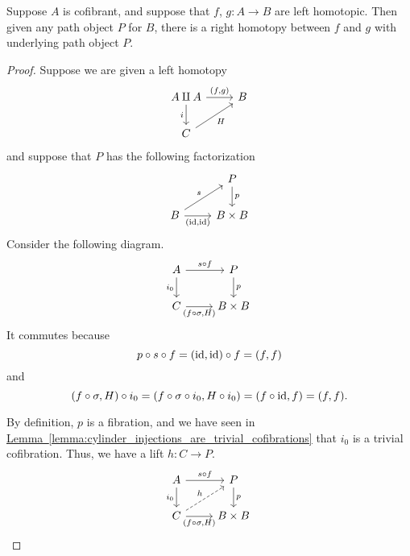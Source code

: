 \documentclass[main.tex]{subfiles}
\begin{document}
\begin{lemma}
  \label{lemma:left_homotopy_implies_right_homotopy}
  Suppose $A$ is cofibrant, and suppose that $f$, $g\colon A \to B$ are left homotopic. Then given any path object $P$ for $B$, there is a right homotopy between $f$ and $g$ with underlying path object $P$.
\end{lemma}
\begin{proof}
  Suppose we are given a left homotopy
  \begin{equation*}
    \begin{tikzcd}
      A \amalg A
      \arrow[r, "{(f, g)}"]
      \arrow[d, swap, "i"]
      & B
      \\
      C
      \arrow[ur, swap, "H"]
    \end{tikzcd}
  \end{equation*}
  and suppose that $P$ has the following factorization
  \begin{equation*}
    \begin{tikzcd}
      & P
      \arrow[d, "p"]
      \\
      B
      \arrow[ur, "s"]
      \arrow[r, swap, "{(\id, \id)}"]
      & B \times B
    \end{tikzcd}
  \end{equation*}
  Consider the following diagram.
  \begin{equation*}
    \begin{tikzcd}
      A
      \arrow[r, "s \circ f"]
      \arrow[d, swap, "i_{0}"]
      & P
      \arrow[d, "p"]
      \\
      C
      \arrow[r, swap, "{(f \circ \sigma, H)}"]
      & B \times B
    \end{tikzcd}
  \end{equation*}
  It commutes because
  \begin{equation*}
    p \circ s \circ f = (\mathrm{id}, \mathrm{id}) \circ f = (f, f)
  \end{equation*}
  and
  \begin{equation*}
    (f \circ \sigma, H) \circ i_{0} = (f \circ \sigma \circ i_{0}, H \circ i_{0}) = (f \circ \mathrm{id}, f) = (f, f).
  \end{equation*}

  By definition, $p$ is a fibration, and we have seen in \hyperref[lemma:cylinder_injections_are_trivial_cofibrations]{Lemma~\ref*{lemma:cylinder_injections_are_trivial_cofibrations}} that $i_{0}$ is a trivial cofibration. Thus, we have a lift $h\colon C \to P$.
  \begin{equation*}
    \begin{tikzcd}
      A
      \arrow[r, "s \circ f"]
      \arrow[d, swap, "i_{0}"]
      & P
      \arrow[d, "p"]
      \\
      C
      \arrow[r, swap, "{(f \circ \sigma, H)}"]
      \arrow[ur, dashed, "h"]
      & B \times B
    \end{tikzcd}
  \end{equation*}


\end{proof}
\end{document}

